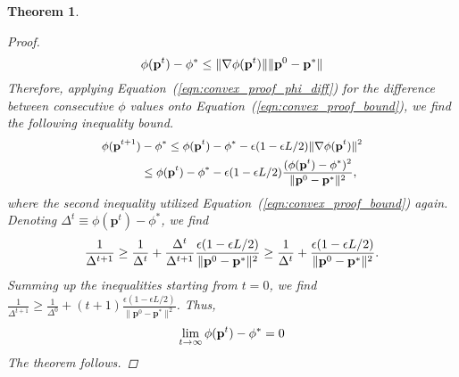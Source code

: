 \documentclass[conference]{IEEEtran}
\theoremstyle{plain}
\newtheorem{theorem}{Theorem}
\newcommand*{\defeq}{\equiv}
\begin{document}
\begin{theorem}
{\begin{proof}
        \begin{equation}\small
            \label{eqn:convex_proof_bound}
            \phi(\mathbf{p}^t) - \phi^* \leq \lVert\nabla\phi(\mathbf{p}^t)\rVert\lVert\mathbf{p}^0-\mathbf{p}^*\rVert
        \end{equation}
        Therefore, applying Equation~(\ref{eqn:convex_proof_phi_diff}) for the difference between consecutive $\phi$ values onto Equation~(\ref{eqn:convex_proof_bound}), we find the following inequality bound.
        \begin{equation}\small
        \begin{split}
            \phi(\mathbf{p}^{t+1}) &- \phi^* \leq \phi(\mathbf{p}^t) - \phi^* - \epsilon(1-\epsilon L/2)\lVert\nabla\phi(\mathbf{p}^t)\rVert^2
            \\&\leq 
            \phi(\mathbf{p}^t) - \phi^* - \epsilon(1-\epsilon L/2)
            \frac{(\phi(\mathbf{p}^t) - \phi^*)^2}{\lVert\mathbf{p}^0-\mathbf{p}^*\rVert^2},
        \end{split}
        \end{equation}
        where the second inequality utilized Equation~(\ref{eqn:convex_proof_bound}) again. Denoting $\Delta^t\defeq\phi(\mathbf{p}^t) - \phi^*$, we find
        \begin{equation}\small
            \frac{1}{\Delta^{t+1}} \geq \frac{1}{\Delta^{t}}+\frac{\Delta^{t}}{\Delta^{t+1}} \frac{\epsilon(1-\epsilon L/2)}{\lVert \mathbf{p}^0 - \mathbf{p}^*\rVert^2} \geq \frac{1}{\Delta^{t}}+ \frac{\epsilon(1-\epsilon L/2)}{\lVert \mathbf{p}^0 - \mathbf{p}^*\rVert^2}.
        \end{equation}
        Summing up the inequalities starting from $t=0$, we find $\frac{1}{\Delta^{t+1}} \geq \frac{1}{\Delta^{0}}+(t+1)\frac{\epsilon(1-\epsilon L/2)}{\lVert \mathbf{p}^0 - \mathbf{p}^*\rVert^2}$. Thus,
        \begin{equation}\small
            \lim_{t\rightarrow \infty} \phi(\mathbf{p}^t) - \phi^*=0
        \end{equation}
        The theorem follows.
    \end{proof}
    }
\end{theorem}
\end{document}
